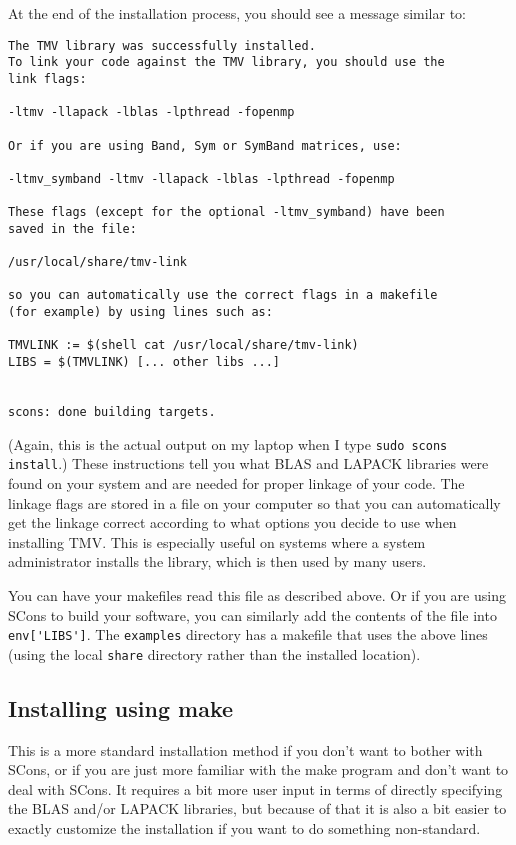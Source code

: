 \documentclass[twoside,letterpaper,11pt]{article}
\renewcommand{\tt}[1]{{\lstinline {#1}}}
\begin{document}
\begin{enumerate}
At the end of the installation process, you should see a message similar to:
\begin{verbatim}
The TMV library was successfully installed.  
To link your code against the TMV library, you should use the 
link flags: 

-ltmv -llapack -lblas -lpthread -fopenmp

Or if you are using Band, Sym or SymBand matrices, use: 

-ltmv_symband -ltmv -llapack -lblas -lpthread -fopenmp

These flags (except for the optional -ltmv_symband) have been
saved in the file:

/usr/local/share/tmv-link

so you can automatically use the correct flags in a makefile
(for example) by using lines such as:

TMVLINK := $(shell cat /usr/local/share/tmv-link)
LIBS = $(TMVLINK) [... other libs ...]


scons: done building targets.
\end{verbatim}
(Again, this is the actual output on my laptop when I type \tt{sudo scons install}.)
These instructions tell you what BLAS and LAPACK libraries were found on your system and 
are needed for proper linkage of your code.  The linkage flags are stored in a file on your
computer so that you can automatically get the linkage correct according to what options
you decide to use when installing TMV.  This is especially useful on systems where a
system administrator installs the library, which is then used by many users.  

You can have your makefiles read this file as described above.  Or if you are using SCons
to build your software, you can similarly add the contents of the file into \tt{env['LIBS']}.
The \tt{examples} directory has a makefile that uses the above lines
(using the local \tt{share} directory rather than the installed location).

\end{enumerate}

\subsection{Installing using make}
\label{Install_Make}
This is a more standard installation method if you don't want to bother with SCons, or if you are just
more familiar with the make program and don't want to deal with SCons.  It requires a bit more
user input in terms of directly specifying the BLAS and/or LAPACK libraries, but because of that
it is also a bit easier to exactly customize the installation if you want to do something non-standard.
\end{document}
